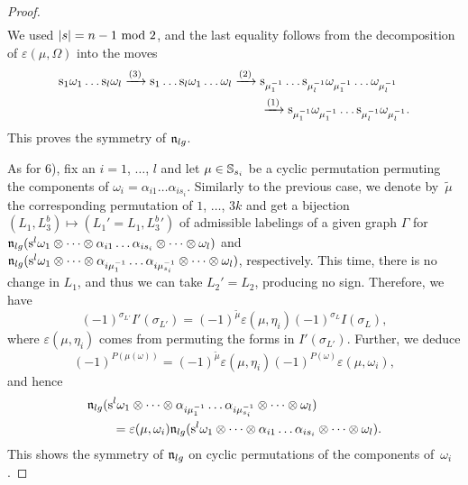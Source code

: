 \documentclass[\MainFolder/Text.tex]{subfiles}
\begin{document}
\begin{proof}
$$\begin{aligned}
\end{aligned} $$
We used $|s| = n-1\text{ mod }2$, and the last equality follows from the decomposition of $\varepsilon(\mu,\Omega)$ into the moves
$$  \begin{multlined} \Susp_1 \omega_1 \dots \Susp_l \omega_l \xrightarrow{(3)} \Susp_1 \dots \Susp_l \omega_1 \dots \omega_l \xrightarrow{(2)} \Susp_{\mu_1^{-1}}\dots \Susp_{\mu_l^{-1}} \omega_{\mu_1^{-1}} \dots \omega_{\mu_l^{-1}} \\ \xrightarrow{(1)} \Susp_{\mu_1^{-1}} \omega_{\mu_1^{-1}} \dots \Susp_{\mu_l^{-1}} \omega_{\mu_l^{-1}}. \end{multlined}$$
This proves the symmetry of $\mathfrak{n}_{lg}$.


As for 6), fix an $i=1$, $\dotsc$, $l$ and let $\mu\in \mathbb{S}_{s_i}$ be a cyclic permutation permuting the components of $\omega_i = \alpha_{i1}\dots \alpha_{is_i}$. Similarly to the previous case, we denote by~$\tilde{\mu}$ the corresponding permutation of $1$, $\dotsc$, $3k$ and get a bijection $(L_1,L_3^b) \mapsto (L_1'=L_1,{L_3^b}')$ of admissible labelings of a given graph $\Gamma$ for $\mathfrak{n}_{lg}(\mathrm{s}^l \omega_1 \otimes \dotsb \otimes \alpha_{i1}\dots \alpha_{is_i} \otimes \dotsb \otimes \omega_l)$ and $\mathfrak{n}_{lg}(\mathrm{s}^l \omega_1 \otimes \dotsb \otimes \alpha_{i\mu_1^{-1}} \dots \alpha_{i\mu_{s_i}^{-1}}\otimes \dotsb \otimes \omega_l)$, respectively. This time, there is no change in $L_1$, and thus we can take $L_2'=L_2$, producing no sign. Therefore, we have
$$ (-1)^{\sigma_{L'}}I'(\sigma_{L'}) = (-1)^{\tilde{\mu}}\varepsilon(\mu,\eta_i)(-1)^{\sigma_{L}}I(\sigma_{L}), $$
where $\varepsilon(\mu,\eta_i)$ comes from permuting the forms in $I'(\sigma_{L'})$. Further, we deduce
$$ (-1)^{P(\mu(\omega))} = (-1)^{\tilde{\mu}} \varepsilon(\mu,\eta_i) (-1)^{P(\omega)} \varepsilon(\mu,\omega_i), $$
and hence
$$ \begin{aligned}
&\mathfrak{n}_{lg}(\mathrm{s}^l \omega_1 \otimes \dotsb \otimes \alpha_{i\mu_1^{-1}} \dots \alpha_{i\mu_{s_i}^{-1}}\otimes \dotsb \otimes \omega_l) \\
&\qquad = \varepsilon(\mu,\omega_i) \mathfrak{n}_{lg}(\mathrm{s}^l \omega_1 \otimes \dotsb \otimes \alpha_{i1}\dots \alpha_{is_i}\otimes\dotsb\otimes \omega_l ). \end{aligned}$$
This shows the symmetry of $\mathfrak{n}_{lg}$ on cyclic permutations of the components of~$\omega_i$.


\end{proof}
\end{document}
